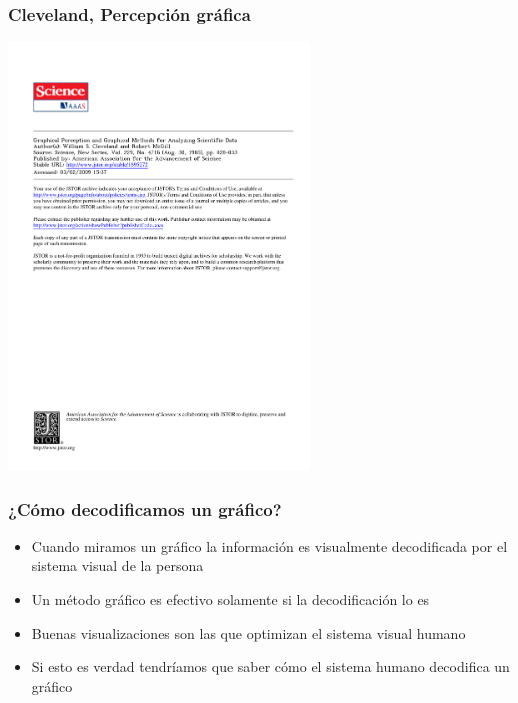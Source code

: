 \documentclass[9pt, spanish]{beamer}\usepackage[]{graphicx}\usepackage[]{color}
\begin{document}
\begin{frame}
\frametitle{Cleveland, Percepci\'on gr\'afica}
\begin{center}
\includegraphics[width=8cm]{cleveland}
\end{center}
\end{frame}

\begin{frame}
\frametitle{¿C\'omo decodificamos un gr\'afico? }


\begin{itemize}
\item Cuando miramos un gr\'afico la informaci\'on es visualmente decodificada por el sistema visual de la persona
\item Un m\'etodo gr\'afico es efectivo solamente si la decodificaci\'on lo es

\item Buenas visualizaciones son las que optimizan el sistema visual humano

\item Si esto es verdad tendr\'iamos que saber c\'omo el sistema humano decodifica un gr\'afico
\end{itemize}

\end{frame}
\end{document}
